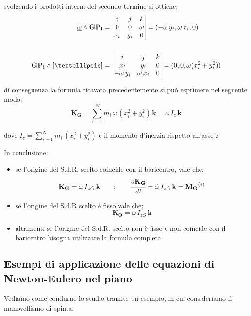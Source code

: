 svolgendo i prodotti interni del secondo termine si ottiene:
\begin{align*}
\und{\omega}\wedge\mathbf{GP_i} &= 
\begin{vmatrix}
i&j&k\\
0&0&\omega\\
x_i&y_i&0\\
\end{vmatrix}
= (-\omega\,y_i, \omega\,x_i,0)\\
\\
\mathbf{GP_i}\wedge \omissis &= 
\begin{vmatrix}
	i&j&k\\
	x_i&y_i&0\\
	-\omega\,y_i&\omega\,x_i&0
\end{vmatrix}
= (0,0, \omega(x_i^2 + y_i^2))
\end{align*}

di conseguenza la formula ricavata precedentemente si può esprimere nel seguente modo:
\[
\mathbf{K_G} = \sum_{i=1}^N m_i\,\omega\,(x_i^2 + y_i^2)\,\mathbf{k} = \omega\,I_z\,\mathbf{k}
\]

dove $I_z = \sum_{i=1}^N m_i\,(x_i^2 + y_i^2)$ è il momento d'inerzia rispetto all'asse z

In conclusione:
\begin{itemize}
\item se l'origine del S.d.R. scelto coincide con il baricentro, vale che:
\begin{gather*}
\mathbf{K_G} = \omega\,I_{zG}\,\mathbf{k}\qquad;\qquad \cfrac{d\mathbf{K_G}}{dt} = \dot{\omega}\,I_{zG}\,\mathbf{k} = \mathbf{M_G}^{(e)}
\end{gather*}
\item se l'origine del S.d.R scelto è fisso vale che;
\[\mathbf{K_O} = \omega\,I_{zO}\,\mathbf{k}\]
\item altrimenti se l'origine del S.d.R. scelto non è fisso e non coincide con il baricentro bisogna utilizzare la formula completa
\end{itemize}
\newpage

\subsection{Esempi di applicazione delle equazioni di Newton-Eulero nel piano}

	Vediamo come condurne lo studio tramite un esempio, in cui consideriamo il manovellismo di spinta.
	\vspace{1mm}

